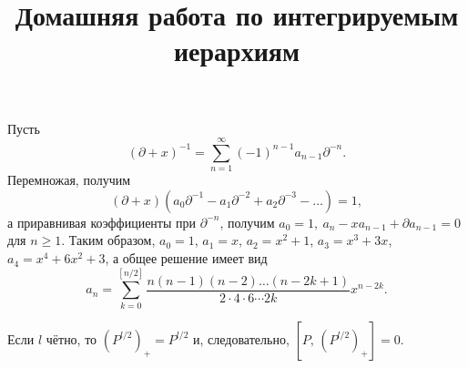 \documentclass[a4paper]{article}
\title{Домашняя работа по интегрируемым иерархиям}
\begin{document}
	\maketitle
\begin{hiProb}[2.3]
\end{hiProb}
\begin{sol}
Пусть
\[
	(\partial+x)^{-1}
	=\sum_{n=1}^{\infty} (-1)^{n-1}
	a_{n-1} \partial^{-n}
.\] 
Перемножая, получим
\[
	(\partial+x)\left( a_0 \partial^{-1}-
	a_1 \partial^{-2}+a_2 \partial^{-3}-\ldots\right) =1
,\]
а приравнивая коэффициенты при $\partial^{-n}$,
получим  $a_0=1,\ a_n-x a_{n-1}+\partial a_{n-1}=0$ 
для $n\ge 1$. Таким образом, $a_0=1$, $a_1=x$,
$a_2=x^2+1$, $a_3=x^3 +3x$, $a_4=x^4 +6 x^2+3$,
а общее решение имеет вид
\[
a_n= \sum_{k=0}^{\left[ n /2 \right] }
\frac{n(n-1)(n-2)\ldots (n-2k+1)}{2\cdot 4\cdot 
6\cdots 2k} x^{n-2k}
.\] 
\end{sol}
\begin{hiProb}[2.5]
\end{hiProb}
\begin{sol}
	Если $l$ чётно, то  $\left( P^{l /2} \right) _+=P^{l /2}$ и, следовательно, $\left[ P,\,\left( P^{l /2} \right) _+ \right] =0$.
\end{sol}
\begin{hiProb}[2.10]
\end{hiProb}
\end{document}
